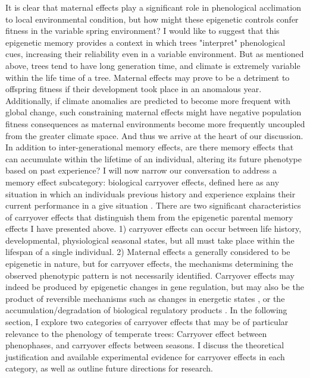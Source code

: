 \documentclass{article}\usepackage[]{graphicx}\usepackage[]{color}
\begin{document}
\par It is clear that maternal effects play a significant role in phenological acclimation to local environmental condition, but how might these epigenetic controls confer fitness in the variable spring environment? I would like to suggest that this epigenetic memory provides a context in which trees "interpret" phenological cues, increasing their reliability even in a variable environment. But as mentioned above, trees tend to have long generation time, and climate is extremely variable within the life time of a tree. Maternal effects may prove to be a detriment to offspring fitness if their development took place in an anomalous year. Additionally, if climate anomalies are predicted to become more frequent with global change, such constraining maternal effects might have negative population fitness consequences as maternal environments become more frequently uncoupled from the greater climate space. And thus we arrive at the heart of our discussion. In addition to inter-generational memory effects, are there memory effects that can accumulate within the lifetime of an individual, altering its future phenotype based on past experience? I will now narrow our conversation to address a memory effect subcategory: biological carryover effects, defined here as any situation in which an individuals previous history and experience explains their current performance in a give situation \citep{O'Connor2014}. There are two significant characteristics of carryover effects that distinguish them from the epigenetic parental memory effects I have presented above. 1) carryover effects can occur between life history, developmental, physiological seasonal states, but all must take place within the lifespan of a single individual. 2) Maternal effects a generally considered to be epigenetic in nature, but for carryover effects, the mechanisms determining the observed phenotypic pattern is not necessarily identified. Carryover effects may indeed be produced by epigenetic changes in gene regulation, but may also be the product of reversible mechanisms such as changes in energetic states \citep{O'Connor2014}, or the accumulation/degradation of biological regulatory products \citep{Gomory2015}. In the following section, I explore two categories of carryover effects that may be of particular relevance to the phenology of temperate trees: Carryover effect between phenophases, and carryover effects between seasons. I discuss the theoretical justification and available experimental evidence for carryover effects in each category, as well as outline future directions for research.
\end{document}
